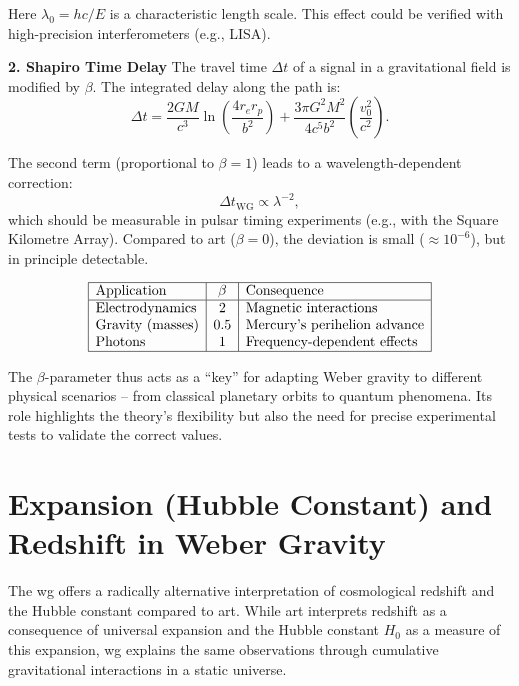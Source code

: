 Here $\lambda_0=hc/E$ is a characteristic length scale. This effect could be verified with high-precision interferometers (e.g., LISA).

\textbf{2. Shapiro Time Delay}
The travel time $\Delta t$ of a signal in a gravitational field is modified by $\beta$. The integrated delay along the path is:
\begin{equation}
\Delta t = \frac{2GM}{c^3} \ln\left(\frac{4r_e r_p}{b^2}\right) + \frac{3\pi G^2 M^2}{4c^5 b^2} \left(\frac{v_0^2}{c^2}\right).
\end{equation}

The second term (proportional to $\beta=1$) leads to a wavelength-dependent correction:
\begin{equation}
    \Delta t_\text{WG} \propto \lambda^{-2},
\end{equation}
which should be measurable in pulsar timing experiments (e.g., with the Square Kilometre Array). Compared to \gls{art} ($\beta=0$), the deviation is small ($\approx 10^{-6}$),
but in principle detectable.

\[
\begin{array}{|l|c|l|}
\hline
\text{Application} & \beta & \text{Consequence} \\
\hline
\text{Electrodynamics} & 2 & \text{Magnetic interactions} \\
\text{Gravity (masses)} & 0.5 & \text{Mercury's perihelion advance} \\
\text{Photons} & 1 & \text{Frequency-dependent effects} \\
\hline
\end{array}
\]

The $\beta$-parameter thus acts as a \enquote{key} for adapting Weber gravity to different physical scenarios – from classical planetary orbits
to quantum phenomena. Its role highlights the theory's flexibility but also the need for precise experimental tests to validate the correct
values.

\section{Expansion (Hubble Constant) and Redshift in Weber Gravity}
The \gls{wg} offers a radically alternative interpretation of cosmological redshift and the Hubble constant compared to \gls{art}. While
\gls{art} interprets redshift as a consequence of universal expansion and the Hubble constant $H_0$ as a measure of this expansion, \gls{wg}
explains the same observations through cumulative gravitational interactions in a static universe.

